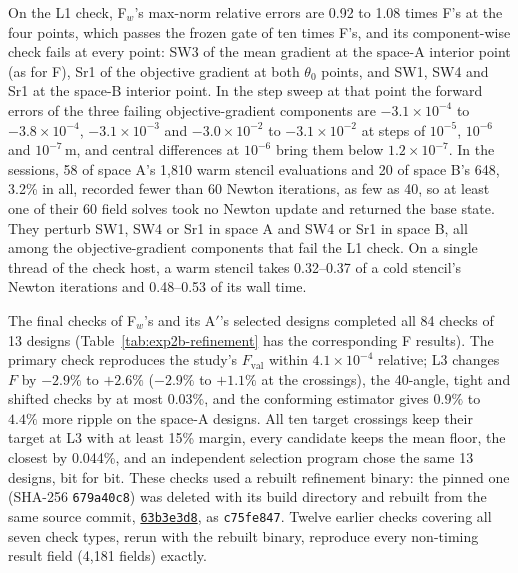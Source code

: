 \documentclass{anvil-paper}
\begin{document}
On the L1 check, F$_w$'s max-norm relative errors are 0.92 to 1.08 times
F's at the four points, which passes the frozen gate of ten times F's, and
its component-wise check fails at every point: SW3 of the mean gradient at
the space-A interior point (as for F), Sr1 of the objective gradient at
both $\theta_0$ points, and SW1, SW4 and Sr1 at the space-B interior point.
In the step sweep at that point the forward errors of the three failing
objective-gradient components are $-3.1\times10^{-4}$ to $-3.8\times10^{-4}$,
$-3.1\times10^{-3}$ and $-3.0\times10^{-2}$ to $-3.1\times10^{-2}$ at steps
of $10^{-5}$, $10^{-6}$ and $10^{-7}$\,m, and central differences at
$10^{-6}$ bring them below $1.2\times10^{-7}$. In the sessions, 58 of
space A's 1,810 warm stencil evaluations and 20 of space B's 648, 3.2\% in
all, recorded fewer than 60 Newton iterations, as few as 40, so at least
one of their 60 field solves took no Newton update and returned the base
state. They perturb SW1, SW4 or Sr1 in space A and SW4 or Sr1 in space B,
all among the objective-gradient components that fail the L1 check. On a single thread of the
check host, a warm stencil takes 0.32--0.37 of a cold stencil's Newton
iterations and 0.48--0.53 of its wall time.

The final checks of F$_w$'s and its A$'$'s selected designs completed all 84
checks of 13 designs (Table~\ref{tab:exp2b-refinement} has the
corresponding F results). The primary check reproduces the study's
$F_{\mathrm{val}}$ within $4.1\times10^{-4}$ relative; L3 changes $F$ by
$-2.9\%$ to $+2.6\%$ ($-2.9\%$ to $+1.1\%$ at the crossings), the 40-angle,
tight and shifted checks by at most $0.03\%$, and the conforming estimator
gives $0.9\%$ to $4.4\%$ more ripple on the space-A designs. All ten target
crossings keep their target at L3 with at least 15\% margin, every
candidate keeps the mean floor, the closest by 0.044\%, and an independent
selection program chose the same 13 designs, bit for bit. These checks used
a rebuilt refinement binary: the pinned one (SHA-256 \texttt{679a40c8}) was
deleted with its build directory and rebuilt from the same source commit,
\href{https://github.com/rjwalters/geode-fem/commit/63b3e3d8bbc30504f845eebb5b78e8be6a2ee12f}{\texttt{63b3e3d8}}, as \texttt{c75fe847}. Twelve earlier checks covering all
seven check types, rerun with the rebuilt binary, reproduce every
non-timing result field (4,181 fields) exactly.

\begin{table}[H]\centering\small
\caption{Warm-stencil arm: charged time units to the first attaining
validation for A$'$ and F$_w$ (repeat~1, F$_w$ session units) and their
ratio per start, with the geometric mean.}
\label{tab:exp2c-ratios}
\end{table}
\end{document}
